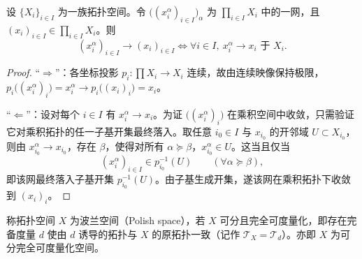\documentclass[lang=cn,a4paper,newtx,figureplace=section,tableplace=section]{elegantbook}
\begin{document}
 \begin{theorem}[乘积中的网收敛判别]\label{thm:product-net-convergence}
  设 $\{X_i\}_{i\in I}$ 为一族拓扑空间。令 $\big((x_i^{\alpha})_{i\in I}\big)_{\alpha}$ 为 $\prod_{i\in I}X_i$ 中的一网，且 $(x_i)_{i\in I}\in\prod_{i\in I}X_i$。则
  \[
   (x_i^{\alpha})_{i\in I} \longrightarrow (x_i)_{i\in I}\iff \forall i\in I,\ x_i^{\alpha}\longrightarrow x_i\text{ 于 }X_i.
  \]
 \end{theorem}
 \begin{proof}
  “$\Rightarrow$”：各坐标投影 $p_i:\prod X_i\to X_i$ 连续，故由连续映像保持极限，$p_i\big((x_i^{\alpha})_i\big)=x_i^{\alpha}\to p_i\big((x_i)_i\big)=x_i$。
  
  “$\Leftarrow$”：设对每个 $i\in I$ 有 $x_i^{\alpha}\to x_i$。为证 $\big((x_i^{\alpha})_i\big)$ 在乘积空间中收敛，只需验证它对乘积拓扑的任一子基开集最终落入。取任意 $i_0\in I$ 与 $x_{i_0}$ 的开邻域 $U\subset X_{i_0}$，则由 $x_{i_0}^{\alpha}\to x_{i_0}$，存在 $\beta$，使得对所有 $\alpha\succeq\beta$，$x_{i_0}^{\alpha}\in U$。这当且仅当
  \[
   (x_i^{\alpha})_{i\in I}\in p_{i_0}^{-1}(U)\qquad(\forall\alpha\succeq\beta),
  \]
  即该网最终落入子基开集 $p_{i_0}^{-1}(U)$。由子基生成开集，遂该网在乘积拓扑下收敛到 $(x_i)_i$。
 \end{proof}
 
 
 \begin{definition}[波兰空间]\label{def:polish-space}
 称拓扑空间 $X$ 为波兰空间（Polish space），若 $X$ 可分且完全可度量化，即存在完备度量 $d$ 使由 $d$ 诱导的拓扑与 $X$ 的原拓扑一致（记作 $\mathcal T_X=\mathcal T_d$）。亦即 $X$ 为可分完全可度量化空间。
 \end{definition}
 
\end{document}
